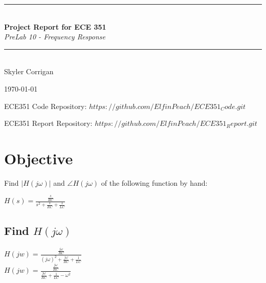 \documentclass[12pt,a4paper]{article}
\newcommand{\HRule}{\rule{\linewidth}{0.5mm}}
\begin{document}
\begin{titlepage}
\begin{center}


\HRule \\[0.4cm]
{ \LARGE 
  \textbf{Project Report for ECE 351}\\[0.4cm]
  \emph{PreLab 10 - Frequency Response}\\[0.4cm]
}
\HRule \\[1.5cm]

{ \large
  Skyler Corrigan \\[0.1cm]
}

\vfill

{\large \today}

{ \large
ECE351 Code Repository: 
\hyperlink{$https://github.com/ElfinPeach/ECE351_Code.git$}{$https://github.com/ElfinPeach/ECE351_Code.git$}

ECE351 Report Repository: 
\hyperlink{$https://github.com/ElfinPeach/ECE351_Report.git$}{$https://github.com/ElfinPeach/ECE351_Report.git$}
}
 
\end{center}
\end{titlepage}


\newpage


\tableofcontents
{}
\newpage
\setcounter{page}{1}

\section{Objective}
Find $|H(j\omega)|$ and $\angle H(j\omega)$ of the following function by hand:
\begin{center}
   $ H(s)=\frac{\frac{s}{RC}}{s^2+\frac{s}{RC}+\frac{1}{LC}}$
\end{center}
\subsection{Find $H(j\omega)$}
\begin{center}
    $H(jw)=\frac{\frac{j\omega}{RC}}{(j\omega)^2+\frac{j\omega}{RC}+\frac{1}{LC}}$ \\
    $H(jw)=\frac{\frac{j\omega}{RC}}{\frac{j\omega}{RC}+\frac{1}{LC}-\omega^2}$ \\
\end{center}
\end{document}
